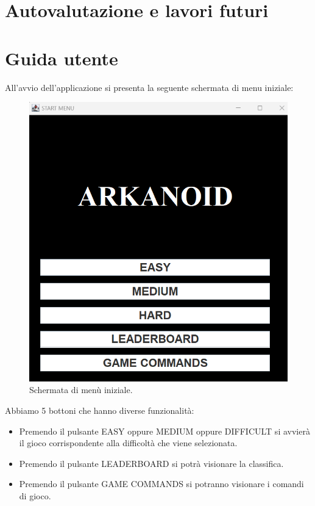 \documentclass[a4paper,12pt]{report}
\begin{document}
\section{Autovalutazione e lavori futuri}

\appendix
\section{Guida utente}
All'avvio dell'applicazione si presenta la seguente schermata di menu iniziale:
\begin{figure}[H]
    \centering{}
    \includegraphics[scale=0.4]{images/StartMenuGuidaUtente.png}
    \caption{Schermata di menù iniziale.}
    \label{images:StartMenuGuidaUtente}
\end{figure}
Abbiamo 5 bottoni che hanno diverse funzionalità:
\begin{itemize}
    \item Premendo il pulsante EASY oppure MEDIUM oppure DIFFICULT si avvierà il gioco corrispondente alla difficoltà che viene selezionata.
    \item Premendo il pulsante LEADERBOARD si potrà visionare la classifica.
    \item Premendo il pulsante GAME COMMANDS si potranno visionare i comandi di gioco.
\end{itemize}
\end{document}
